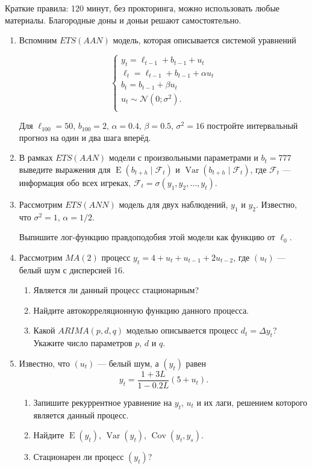 \documentclass[12pt]{article}
\DeclareMathOperator{\Cov}{Cov}
\DeclareMathOperator{\Var}{Var}
\DeclareMathOperator{\E}{E}
\def \cN{\mathcal{N}}
\begin{document}
Краткие правила: 120 минут, без прокторинга, можно использовать любые материалы. 
Благородные доны и доньи решают самостоятельно. 

\begin{enumerate}

\item Вспомним $ETS(AAN)$ модель, которая описывается системой уравнений

	\[
	\begin{cases}
	y_t = \ell_{t-1} + b_{t-1} + u_t \\
	\ell_t = \ell_{t-1} + b_{t-1} + \alpha u_t \\
	b_t = b_{t-1} + \beta u_t \\
	u_t \sim \cN(0;\sigma^2). \\
	\end{cases}
	\]
	
		
Для $\ell_{100} = 50$, $b_{100} = 2$, $\alpha=0.4$, $\beta=0.5$, $\sigma^2 = 16$ постройте
интервальный прогноз на один и два шага вперёд. 


\item В рамках $ETS(AAN)$ модели с произвольными параметрами и $b_t = 777$ выведите выражения для $\E(b_{t+h} \mid \mathcal{F}_t)$ 
и $\Var(b_{t+h} \mid \mathcal{F}_t)$, где $\mathcal{F}_t$ — информация обо всех игреках, 
$\mathcal{F}_t= \sigma(y_1, y_2, \ldots, y_t)$.

\item Рассмотрим $ETS(ANN)$ модель для двух наблюдений, $y_1$ и $y_2$. Известно, что $\sigma^2 = 1$, $\alpha = 1/2$.

Выпишите лог-функцию правдоподобия этой модели как функцию от $\ell_0$. 

\item Рассмотрим $MA(2)$ процесс $y_t = 4 + u_t + u_{t-1} + 2 u_{t-2}$, где $(u_t)$ — белый шум с дисперсией $16$.

\begin{enumerate}
	\item Является ли данный процесс стационарным?
	\item Найдите автокорреляционную функцию данного процесса. 
	\item Какой $ARIMA(p, d, q)$ моделью описывается процесс $d_t = \Delta y_t$? Укажите число параметров $p$, $d$ и $q$.
\end{enumerate}


\item Известно, что $(u_t)$ — белый шум, а $(y_t)$ равен 
\[
y_t = \frac{1 + 3L}{1 - 0.2 L} (5 + u_t).	
\]
\begin{enumerate}
	\item Запишите рекуррентное уравнение на $y_t$, $u_t$ и их лаги, решением которого является данный процесс. 
	\item Найдите $\E(y_t)$, $\Var(y_t)$, $\Cov(y_t, y_s)$.
	\item Стационарен ли процесс $(y_t)$?
\end{enumerate}



\end{enumerate}
\end{document}
